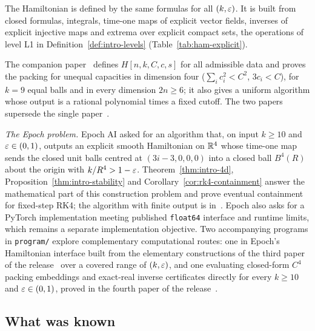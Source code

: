 The Hamiltonian is defined by the same formulas for all $(k,\varepsilon)$. It is built from closed formulas, integrals,
time-one maps of explicit vector fields, inverses of explicit injective maps and extrema over explicit compact sets,
the operations of level L1 in Definition~\ref{def:intro-levels} (Table~\ref{tab:ham-explicit}).

The companion paper~\cite{SongHD} defines $H[n,k,C,c,s]$ for all admissible data and proves the packing for unequal
capacities in dimension four ($\sum_ic_i^2<C^2$, $3c_i<C$), for $k=9$ equal balls and in every dimension $2n\ge6$; it
also gives a uniform algorithm whose output is a rational polynomial times a fixed cutoff. The two papers supersede
the single paper~\cite{SongAll}.

\emph{The Epoch problem.} Epoch AI \cite{Epoch} asked for an algorithm that, on input $k\ge10$ and $\varepsilon\in(0,1)$,
outputs an explicit smooth Hamiltonian on $\mathbb{R}^4$ whose time-one map sends the closed unit balls centred at
$(3i-3,0,0,0)$ into a closed ball $B^4(R)$ about the origin with $k/R^4>1-\varepsilon$. Theorem~\ref{thm:intro-4d},
Proposition~\ref{thm:intro-stability} and Corollary~\ref{cor:rk4-containment} answer the mathematical part of this
construction problem and prove eventual containment for fixed-step RK4; the algorithm with finite output is
in~\cite{SongHD}. Epoch also asks for a PyTorch implementation meeting published \texttt{float64} interface and runtime
limits, which remains a separate implementation objective. Two accompanying programs in \texttt{program/} explore
complementary computational routes: one in Epoch's Hamiltonian interface built from the elementary constructions of the
third paper of the release~\cite{SongP3} over a covered range of $(k,\varepsilon)$, and one evaluating closed-form $C^4$
packing embeddings and exact-real inverse certificates directly for every $k\ge10$ and $\varepsilon\in(0,1)$, proved in the
fourth paper of the release~\cite{SongP4}.

\subsection{What was known}\label{sec:intro-prior}


